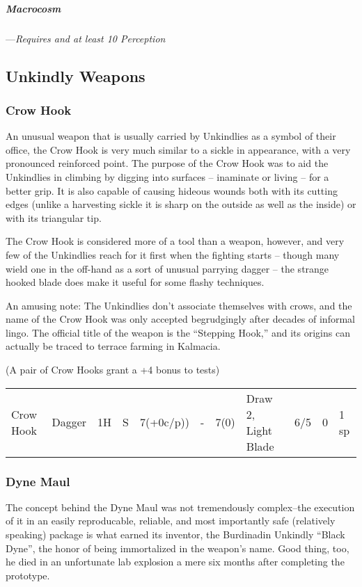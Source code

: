\documentclass[oneside,11pt,english]{book}
\begin{document}
\subparagraph{Macrocosm}\label{honor:Macrocosm}
---\quad \emph{Requires  and at least 10 Perception}

\subsection{Unkindly Weapons}
\subsubsection{Crow Hook}
An unusual weapon that is usually carried by Unkindlies as a symbol of their
office, the Crow Hook is very much similar to a sickle in appearance, with a
very pronounced reinforced point. The purpose of the Crow Hook was to aid the
Unkindlies in climbing by digging into surfaces -- inaminate or living -- for a
better grip. It is also capable of causing hideous wounds both with its cutting
edges (unlike a harvesting sickle it is sharp on the outside as well as the
inside) or with its triangular tip.

The Crow Hook is considered more of a tool than a weapon, however, and very few
of the Unkindlies reach for it first when the fighting starts -- though many
wield one in the off-hand as a sort of unusual parrying dagger -- the strange
hooked blade does make it useful for some flashy techniques.

An amusing note: The Unkindlies don’t associate themselves with crows, and the
name of the Crow Hook was only accepted begrudgingly after decades of informal
lingo. The official title of the weapon is the “Stepping Hook,” and its origins
can actually be traced to terrace farming in Kalmacia.

(A pair of Crow Hooks grant a +4 bonus to  tests)

\begin{tabu} spread 0pt {*{11}{X[-1]}}
  Crow Hook & Dagger & 1H & S & 7(+0c/p)) & - & 7(0) & Draw 2, Light Blade & 6/5 & 0 & 1 sp \\
\end{tabu}

\subsubsection{Dyne Maul}
The concept behind the Dyne Maul was not tremendously complex--the execution of
it in an easily reproducable, reliable, and most importantly safe (relatively
speaking) package is what earned its inventor, the Burdinadin Unkindly ``Black
Dyne'', the honor of being immortalized in the weapon’s name. Good thing, too,
he died in an unfortunate lab explosion a mere six months after completing the
prototype.
\end{document}
